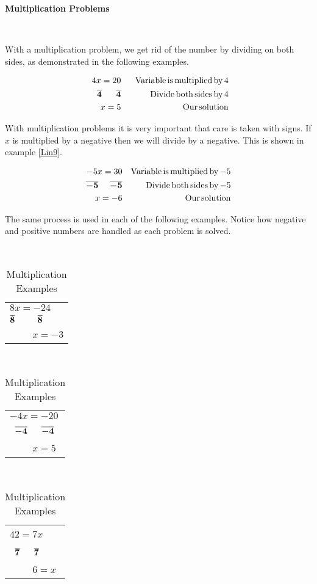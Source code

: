 {\textbf{Multiplication Problems}}\par
~\par
With a multiplication problem, we get rid of the number by dividing on both
sides, as demonstrated in the following examples.

\begin{example}\label{Lin8}
  \begin{eqnarray*}
    4 x = 20 ~~&  & \operatorname{Variable} \operatorname{is} \operatorname{multiplied} \operatorname{by} 4\\
    ~~~\boldsymbol{\overline{4} ~~~~~ \overline{4}}~~ &  & \operatorname{Divide} \operatorname{both}
    \operatorname{sides} \operatorname{by} 4\\
    x = 5~~ &  & \operatorname{Our} \operatorname{solution}
  \end{eqnarray*}
\end{example}

With multiplication problems it is very important that care is taken with
signs. If $x$ is multiplied by a negative then we will divide by a negative.
This is shown in example \ref{Lin9}.

\begin{example}\label{Lin9}
  \begin{eqnarray*}
    - 5 x = 30 &  & \operatorname{Variable} \operatorname{is} \operatorname{multiplied} \operatorname{by} -
    5\\
    \boldsymbol{\overline{- 5} ~~~~ \overline{- 5}} &  & \operatorname{Divide} \operatorname{both}
    \operatorname{sides} \operatorname{by} - 5\\
    x = - 6 &  & \operatorname{Our} \operatorname{solution}
  \end{eqnarray*}
\end{example}

The same process is used in each of the following examples. Notice how
negative and positive numbers are handled as each problem is solved.

\begin{example}\label{Lin10}
~\end{example}
 
 \begin{table}[h]
    \begin{tabular}{l}
      $8 x = - 24$\\
      $\boldsymbol{\overline{8} ~~~~~~~~ \overline{8}}$\\
      ~~~~ $x = - 3$
    \end{tabular} \ \ \ \ \ \ \ \ \ \ \ \ \ \ \ \ \ \ \ \begin{tabular}{l}
      $- 4 x = - 20$\\
      \ $\boldsymbol{\overline{- 4} ~~~~~ \overline{- 4}}$\\
      ~~~~ $x = 5$
    \end{tabular} \ \ \ \ \ \ \ \ \ \ \ \ \ \ \ \ \ \ \ \begin{tabular}{l}
      $42 = 7 x$~~\\
      ~$\boldsymbol{\overline{7} ~~~~~ \overline{7}}$\\
      ~~~~ $6 = x$
    \end{tabular}
    \caption{Multiplication Examples}
  \end{table}

